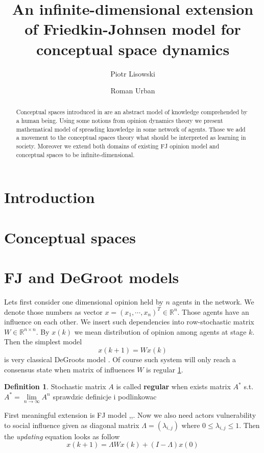 \documentclass[leqno,12pt]{amsart}
\title[Conceptual spaces dynamics]{An infinite-dimensional extension of Friedkin-Johnsen model  for conceptual space dynamics}
\author[P. Lisowski]{Piotr Lisowski}
\author[R. Urban]{Roman Urban}
\theoremstyle{remark}
\theoremstyle{remark}
\theoremstyle{remark}
\theoremstyle{definition}
\newtheorem{definition}[theorem]{Definition}
\numberwithin{equation}{section}
\newcommand{\R}{\ensuremath{\mathbb{R}}}
\begin{document}
% 
% 
% 
% 
% 
% 
\begin{abstract}
    Conceptual spaces introduced in \cite{} are an abstract model of knowledge comprehended by a human being. Using some notions from opinion dynamics theory we present mathematical model of spreading knowledge in some network of agents. Those we add a movement to the conceptual spaces theory what should be interpreted as learning in society. Moreover we extend both domains of existing FJ opinion model and conceptual spaces to be infinite-dimensional. 
\end{abstract}
\maketitle
\section{Introduction}
\section{Conceptual spaces}
% 
% 
\section{FJ and DeGroot models}
Lets first consider one dimensional opinion held by $n$ agents in the network. We denote those numbers as vector $x = (x_1, \cdots , x_n)^T \in \R^n$. Those agents have an influence on each other. We insert such dependencies into row-stochastic matrix $W\in \R^{n\times n}$. By $x(k)$ we mean distribution of opinion among agents at stage $k$. Then the simplest model
\begin{equation}\label{eq:degroot}
    x(k+1) = Wx(k)
\end{equation}
is very classical DeGroots model \cite{bib:degroot}. Of course such system will only reach a consensus state when matrix of influences $W$ is regular \ref{def:regular}.
\begin{definition}\label{def:regular}
    Stochastic matrix $A$ is called \textbf{regular} when exists matrix $A^*$ s.t. $A^*=\lim\limits_{n\to \infty}A^n$ {\color{red}sprawdzic definicje i podlinkowac}
\end{definition}
First meaningful extension is FJ model \cite{bib:fj1},\cite{bib:fj2},\cite{bib:fj3}. 
Now we also need actors vulnerability to social influence given as diagonal matrix $\Lambda=(\lambda_{i,j})$ where $0\leqslant \lambda_{i,j} \leqslant 1$. Then the \textit{updating} equation looks as follow
\begin{equation}\label{eq:fj}
    x(k+1)=\Lambda Wx(k)+(I-\Lambda)x(0)
\end{equation}  
\end{document}
